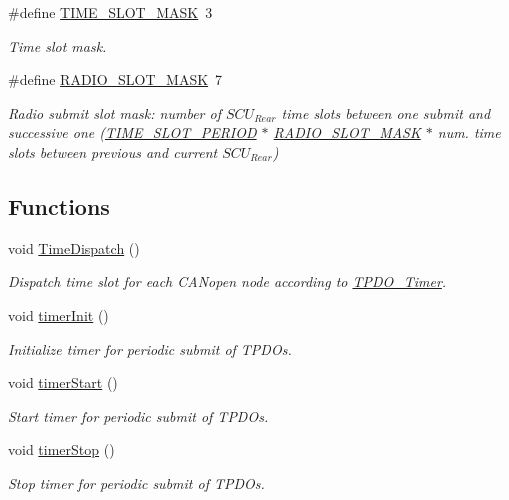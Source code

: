\begin{DoxyCompactItemize}
\#define \mbox{\hyperlink{group___c_a_nopen__timer__module_gaab4fadccdeb20ba1f44ed01296b7e560}{T\+I\+M\+E\+\_\+\+S\+L\+O\+T\+\_\+\+M\+A\+SK}}~3
\begin{DoxyCompactList}\small\item\em Time slot mask. \end{DoxyCompactList}\item 
\mbox{\label{group___c_a_nopen__timer__module_gaf3ebceeca1e0dded3572b4367c5d6413}} 
\#define \mbox{\hyperlink{group___c_a_nopen__timer__module_gaf3ebceeca1e0dded3572b4367c5d6413}{R\+A\+D\+I\+O\+\_\+\+S\+L\+O\+T\+\_\+\+M\+A\+SK}}~7
\begin{DoxyCompactList}\small\item\em Radio submit slot mask\+: number of $SCU_{Rear}$ time slots between one submit and successive one (\mbox{\hyperlink{group___common__defines__group_ga09c95853fd002fab968d94c5bc44e823}{T\+I\+M\+E\+\_\+\+S\+L\+O\+T\+\_\+\+P\+E\+R\+I\+OD}} $\ast$ \mbox{\hyperlink{group___c_a_nopen__timer__module_gaf3ebceeca1e0dded3572b4367c5d6413}{R\+A\+D\+I\+O\+\_\+\+S\+L\+O\+T\+\_\+\+M\+A\+SK}} $\ast$ num. time slots between previous and current $SCU_{Rear}$) \end{DoxyCompactList}\end{DoxyCompactItemize}
\subsection*{Functions}
\begin{DoxyCompactItemize}
\item 
void \mbox{\hyperlink{group___c_a_nopen__timer__module_gafa75192a3238525618f8cb83004930cc}{Time\+Dispatch}} ()
\begin{DoxyCompactList}\small\item\em Dispatch time slot for each C\+A\+Nopen node according to \mbox{\hyperlink{_c_a_n_network_page_TPDO_Timer}{T\+P\+D\+O\+\_\+\+Timer}}. \end{DoxyCompactList}\item 
void \mbox{\hyperlink{group___c_a_nopen__timer__module_gaf927959e78504fd1afe1be1e10791ae0}{timer\+Init}} ()
\begin{DoxyCompactList}\small\item\em Initialize timer for periodic submit of T\+P\+D\+Os. \end{DoxyCompactList}\item 
void \mbox{\hyperlink{group___c_a_nopen__timer__module_gaddf92f4b7b741f7b9fbc827d2e4f2a8b}{timer\+Start}} ()
\begin{DoxyCompactList}\small\item\em Start timer for periodic submit of T\+P\+D\+Os. \end{DoxyCompactList}\item 
void \mbox{\hyperlink{group___c_a_nopen__timer__module_gaecc39b6c4a6a4d79a46ac2b6371221c5}{timer\+Stop}} ()
\begin{DoxyCompactList}\small\item\em Stop timer for periodic submit of T\+P\+D\+Os. \end{DoxyCompactList}\end{DoxyCompactItemize}
